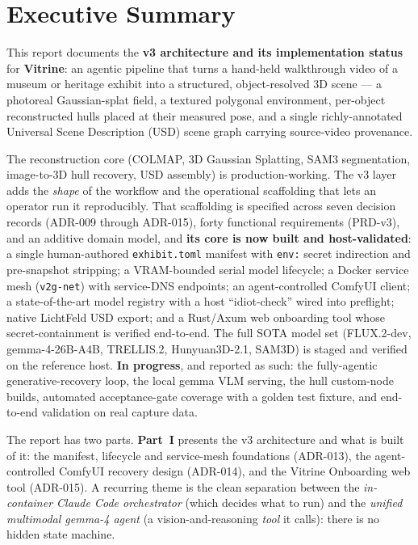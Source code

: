 \documentclass[a4paper,11pt]{report}
\newcommand{\code}[1]{\texttt{#1}}
\begin{document}

\chapter*{Executive Summary}

This report documents the \textbf{v3 architecture and its implementation status} for \textbf{Vitrine}:
an agentic pipeline that turns a hand-held walkthrough video of a museum or heritage exhibit into a
structured, object-resolved 3D scene — a photoreal Gaussian-splat field, a textured polygonal
environment, per-object reconstructed hulls placed at their measured pose, and a single richly-annotated
Universal Scene Description (USD) scene graph carrying source-video provenance.

The reconstruction core (COLMAP, 3D Gaussian Splatting, SAM3 segmentation, image-to-3D hull recovery,
USD assembly) is production-working. The v3 layer adds the \emph{shape} of the workflow and the
operational scaffolding that lets an operator run it reproducibly. That scaffolding is specified across
seven decision records (ADR-009 through
ADR-015), forty functional requirements (PRD-v3), and an additive domain model, and \textbf{its core is
now built and host-validated}: a single human-authored \code{exhibit.toml} manifest with \code{env:}
secret indirection and pre-snapshot stripping; a VRAM-bounded serial model lifecycle; a Docker service
mesh (\code{v2g-net}) with service-DNS endpoints; an agent-controlled ComfyUI client; a state-of-the-art
model registry with a host ``idiot-check'' wired into preflight; native LichtFeld USD export; and a
Rust/Axum web onboarding tool whose secret-containment is verified end-to-end. The full SOTA model set
(FLUX.2-dev, gemma-4-26B-A4B, TRELLIS.2, Hunyuan3D-2.1, SAM3D) is staged and verified on the reference
host. \textbf{In progress}, and reported as such: the fully-agentic generative-recovery loop, the local
gemma VLM serving, the hull custom-node builds, automated acceptance-gate coverage with a golden test
fixture, and end-to-end validation on real capture data.

The report has two parts. \textbf{Part~I} presents the v3 architecture and what is built of it: the
manifest, lifecycle and service-mesh foundations (ADR-013), the agent-controlled ComfyUI recovery
design (ADR-014), and the Vitrine Onboarding web tool (ADR-015). A
recurring theme is the clean separation between the \emph{in-container Claude Code orchestrator} (which
decides what to run) and the \emph{unified multimodal gemma-4 agent} (a vision-and-reasoning \emph{tool}
it calls): there is no hidden state machine.
\end{document}
